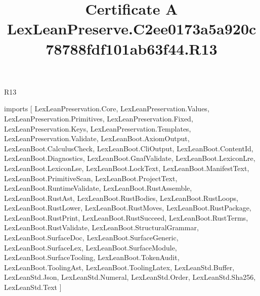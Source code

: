 \begin{lexlean}{R13}
\title{Certificate A LexLeanPreserve.C2ee0173a5a920c78788fdf101ab63f44.R13}
\begin{coremodule}
imports [
  LexLeanPreservation.Core,
  LexLeanPreservation.Values,
  LexLeanPreservation.Primitives,
  LexLeanPreservation.Fixed,
  LexLeanPreservation.Keys,
  LexLeanPreservation.Templates,
  LexLeanPreservation.Validate,
  LexLeanBoot.AxiomOutput,
  LexLeanBoot.CalculusCheck,
  LexLeanBoot.CliOutput,
  LexLeanBoot.ContentId,
  LexLeanBoot.Diagnostics,
  LexLeanBoot.GnafValidate,
  LexLeanBoot.LexiconLre,
  LexLeanBoot.LexiconLse,
  LexLeanBoot.LockText,
  LexLeanBoot.ManifestText,
  LexLeanBoot.PrimitiveScan,
  LexLeanBoot.ProjectText,
  LexLeanBoot.RuntimeValidate,
  LexLeanBoot.RustAssemble,
  LexLeanBoot.RustAst,
  LexLeanBoot.RustBodies,
  LexLeanBoot.RustLoops,
  LexLeanBoot.RustLower,
  LexLeanBoot.RustMoves,
  LexLeanBoot.RustPackage,
  LexLeanBoot.RustPrint,
  LexLeanBoot.RustSucceed,
  LexLeanBoot.RustTerms,
  LexLeanBoot.RustValidate,
  LexLeanBoot.StructuralGrammar,
  LexLeanBoot.SurfaceDoc,
  LexLeanBoot.SurfaceGeneric,
  LexLeanBoot.SurfaceLex,
  LexLeanBoot.SurfaceModule,
  LexLeanBoot.SurfaceTooling,
  LexLeanBoot.TokenAudit,
  LexLeanBoot.ToolingAst,
  LexLeanBoot.ToolingLatex,
  LexLeanStd.Buffer,
  LexLeanStd.Json,
  LexLeanStd.Numeral,
  LexLeanStd.Order,
  LexLeanStd.Sha256,
  LexLeanStd.Text
]


\end{coremodule}
\end{lexlean}
